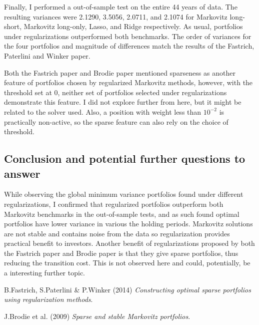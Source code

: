 \documentclass{article}
\begin{document}
Finally, I performed a out-of-sample test on the entire 44 years of data. The
resulting variances were 2.1290, 3.5056, 2.0711, and 2.1074 for Markovitz long-short,
Markovitz long-only, Lasso, and Ridge respectively. As usual, portfolios under
regularizations
outperformed both benchmarks. The order of variances for the four portfolios
and magnitude of differences
match the results of the Fastrich, Paterlini and Winker paper.

Both the Fastrich paper and Brodie paper mentioned sparseness as another
feature of portfolios chosen by regularized Markovitz methods, however, with
the threshold set at 0,
neither set of portfolios selected under regularizations demonstrate this feature. I
did not explore further from here, but it might be related to the solver used. Also,
a position with weight less than $10^{-2}$ is practically non-active, so the
sparse feature can also rely on the choice of threshold.

\subsection*{Conclusion and potential further questions to answer}

While observing the global minimum variance portfolios found under different regularizations,
I confirmed that regularized portfolios outperform both Markovitz benchmarks
in the out-of-sample tests, and as such found optimal portfolios have lower variance in various
the holding periods. Markovitz solutions are not stable and contains noise from the
data so regularization provides practical benefit to investors. Another benefit
of regularizations proposed by both the Fastrich paper and Brodie paper is that
they give
sparse portfolios, thus reducing the transition cost. This is not observed here
and could, potentially, be a interesting further topic.

\begin{thebibliography}{9}
B.Fastrich, S.Paterlini \& P.Winker (2014)
\textit{Constructing optimal sparse portfolios using regularization methods}.

J.Brodie et al. (2009)
\textit{Sparse and stable Markovitz portfolios}.
\end{thebibliography}
\end{document}
